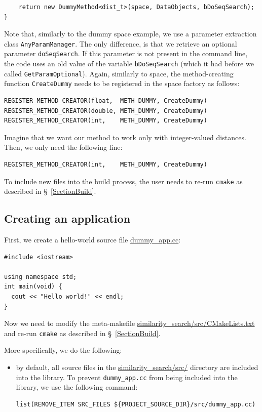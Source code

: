 \documentclass[runningheads,a4paper]{llncs}
\newcommand{\ttt}[1]{\texttt{#1}}
\begin{document}
{\begin{verbatim}
    return new DummyMethod<dist_t>(space, DataObjects, bDoSeqSearch);
}
\end{verbatim}
Note that, similarly to the dummy space example,
we use a parameter extraction class \ttt{AnyParamManager}.
The only difference, is that we retrieve an optional parameter \ttt{doSeqSearch}.
If this parameter is not present in the command line,
the code uses an old value of the variable \ttt{bDoSeqSearch}
(which it had before we called \ttt{GetParamOptional}). 
Again, similarly to space, the method-creating function \ttt{CreateDummy} needs
to be registered in the space factory as follows:
\begin{verbatim}
REGISTER_METHOD_CREATOR(float,  METH_DUMMY, CreateDummy)
REGISTER_METHOD_CREATOR(double, METH_DUMMY, CreateDummy)
REGISTER_METHOD_CREATOR(int,    METH_DUMMY, CreateDummy)
\end{verbatim}
Imagine that we want our method to work only with integer-valued distances.
Then, we only need the following line:
\begin{verbatim}
REGISTER_METHOD_CREATOR(int,    METH_DUMMY, CreateDummy)
\end{verbatim}
To include new files into the build process, 
the user needs to re-run \ttt{cmake} as described in \S~\ref{SectionBuild}.

\subsection{Creating an application}\label{SectionCreateApp}
First, we create a hello-world source file 
\href{https://github.com/searchivarius/NonMetricSpaceLib/tree/master/similarity_search/src/dummy_app.cc}{dummy\_app.cc}:
\begin{verbatim}
#include <iostream>

using namespace std;
int main(void) {
  cout << "Hello world!" << endl;
}
\end{verbatim}
Now we need to modify the meta-makefile
\href{https://github.com/searchivarius/NonMetricSpaceLib/blob/master/similarity_search/src/CMakeLists.txt}{similarity\_search/src/CMakeLists.txt} and 
re-run \ttt{cmake} as described in \S~\ref{SectionBuild}.

\newpage
More specifically, we do the following:
\begin{itemize}
\item by default, all source files in the  
\href{https://github.com/searchivarius/NonMetricSpaceLib/blob/master/similarity_search/src/}{similarity\_search/src/} directory are included into the library.
To prevent \ttt{dummy\_app.cc} from being included into the library, we use the following command:
\begin{verbatim}
list(REMOVE_ITEM SRC_FILES ${PROJECT_SOURCE_DIR}/src/dummy_app.cc)
\end{verbatim}


\end{itemize}}
\end{document}
